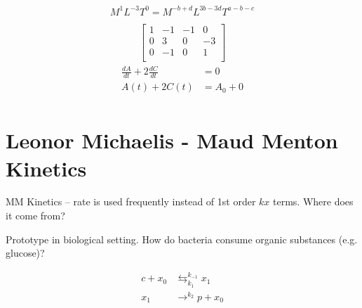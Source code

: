 \documentclass[
	date={October 21{,} 2024},
	month={10},
	day={21}
]{math486notes}
\begin{document}
\begin{example}
\begin{equation*}
\begin{aligned}
		M^{1}L^{-3}T^{0} = M^{-b+d}L^{3b-3d}T^{a-b-c}\\
	\end{aligned}
	\end{equation*}
	\begin{equation*}
	\begin{aligned}
		\left[ \begin{array}{cccc}
			1 & -1 & -1 & 0\\ %
			0 & 3 & 0 & -3\\ %
			0 & -1 & 0 & 1\\ %
		\end{array} \right]
	\end{aligned}
	\end{equation*}
	\begin{equation*}
	\begin{aligned}
		\frac{dA}{dt} + 2\frac{dC}{dt} &= 0\\
		A(t) + 2C(t) &= A_{0} + 0\\
	\end{aligned}
	\end{equation*}
\end{example}

\section[Michaelis-Menton Kinetics]{Leonor Michaelis - Maud Menton Kinetics}\label{sec:michaelis-menton-kinetics}

MM Kinetics -- rate is used frequently instead of 1st order $kx$ terms.
Where does it come from?

Prototype in biological setting.
How do bacteria consume organic substances (e.g. glucose)?

\begin{equation*}
\begin{aligned}
	c + x_{0} &\leftrightarrows^{k_{-1}}_{k_{1}} x_{1}\\
	x_{1} & \rightarrow^{k_{2}} p + x_{0}
\end{aligned}
\end{equation*}
\end{document}
